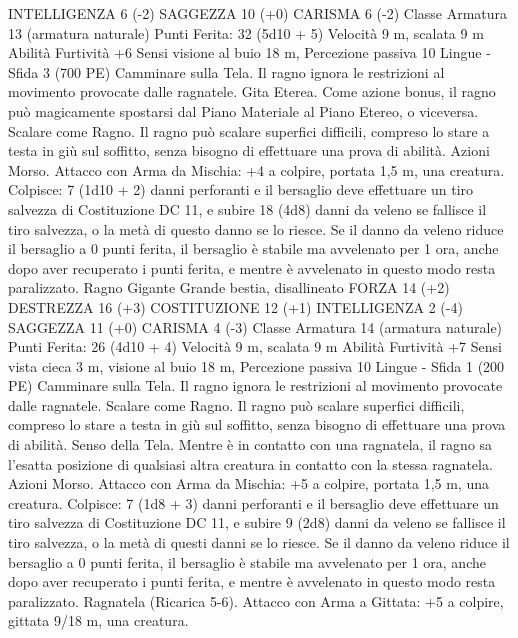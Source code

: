 \begin{multicols}{2}
INTELLIGENZA 6 (-2)
SAGGEZZA 10 (+0)
CARISMA 6 (-2)
Classe Armatura 13 (armatura naturale)
\hspace*{0pt}\hfill{Punti Ferita}: 32 (5d10 + 5)
Velocità 9 m, scalata 9 m
Abilità Furtività +6
Sensi visione al buio 18 m, Percezione passiva 10
Lingue -
Sfida 3 (700 PE)
Camminare sulla Tela. Il ragno ignora le restrizioni al
movimento provocate dalle ragnatele.
Gita Eterea. Come azione bonus, il ragno può magicamente
spostarsi dal Piano Materiale al Piano Etereo, o viceversa.
Scalare come Ragno. Il ragno può scalare superfici difficili,
compreso lo stare a testa in giù sul soffitto, senza bisogno di
effettuare una prova di abilità.
Azioni
Morso. Attacco con Arma da Mischia: +4 a colpire, portata 1,5
m, una creatura.
Colpisce: 7 (1d10 + 2) danni perforanti e il bersaglio deve
effettuare un tiro salvezza di Costituzione DC 11, e subire 18
(4d8) danni da veleno se fallisce il tiro salvezza, o la metà di
questo danno se lo riesce. Se il danno da veleno riduce il
bersaglio a 0 punti ferita, il bersaglio è stabile ma avvelenato per
1 ora, anche dopo aver recuperato i punti ferita, e mentre è
avvelenato in questo modo resta paralizzato.
Ragno Gigante
Grande bestia, disallineato
FORZA 14 (+2)
DESTREZZA 16 (+3)
COSTITUZIONE 12 (+1)
INTELLIGENZA 2 (-4)
SAGGEZZA 11 (+0)
CARISMA 4 (-3)
Classe Armatura 14 (armatura naturale)
\hspace*{0pt}\hfill{Punti Ferita}: 26 (4d10 + 4)
Velocità 9 m, scalata 9 m
Abilità Furtività +7
Sensi vista cieca 3 m, visione al buio 18 m, Percezione passiva
10
Lingue -
Sfida 1 (200 PE)
Camminare sulla Tela. Il ragno ignora le restrizioni al
movimento provocate dalle ragnatele.
Scalare come Ragno. Il ragno può scalare superfici difficili,
compreso lo stare a testa in giù sul soffitto, senza bisogno di
effettuare una prova di abilità.
Senso della Tela. Mentre è in contatto con una ragnatela, il
ragno sa l’esatta posizione di qualsiasi altra creatura in contatto
con la stessa ragnatela.
Azioni
Morso. Attacco con Arma da Mischia: +5 a colpire, portata 1,5
m, una creatura.
Colpisce: 7 (1d8 + 3) danni perforanti e il bersaglio deve
effettuare un tiro salvezza di Costituzione DC 11, e subire 9
(2d8) danni da veleno se fallisce il tiro salvezza, o la metà di
questi danni se lo riesce. Se il danno da veleno riduce il bersaglio
a 0 punti ferita, il bersaglio è stabile ma avvelenato per 1 ora,
anche dopo aver recuperato i punti ferita, e mentre è avvelenato
in questo modo resta paralizzato.
Ragnatela (Ricarica 5-6). Attacco con Arma a Gittata: +5 a
colpire, gittata 9/18 m, una creatura.

\end{multicols}
